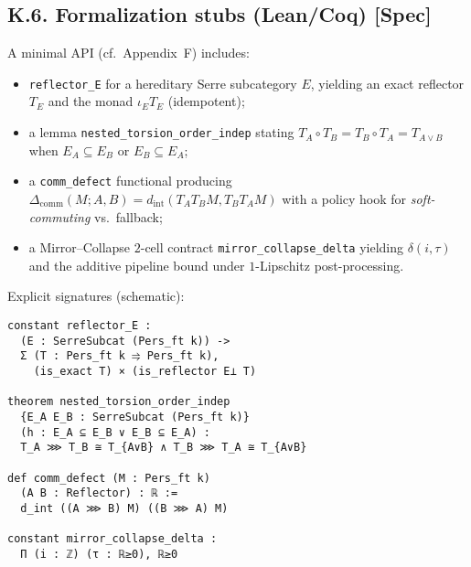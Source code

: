 \documentclass[11pt]{article}
\numberwithin{equation}{section}
\theoremstyle{plain}
\theoremstyle{definition}
\theoremstyle{remark}
\DeclareRobustCommand{\hyp}{\nobreakdash-}
\theoremstyle{plain}
\theoremstyle{definition}
\numberwithin{equation}{section}
\theoremstyle{definition}
\numberwithin{equation}{section}
\theoremstyle{plain}
\theoremstyle{definition}
\theoremstyle{remark}
\begin{document}
\subsection*{K.6. Formalization stubs (Lean/Coq) [Spec]}
A minimal API (cf.\ Appendix~F) includes:
\begin{itemize}\itemsep0.2em
  \item \texttt{reflector\_E} for a hereditary Serre subcategory \(E\), yielding an exact reflector \(T_E\) and the monad \(\iota_E T_E\) (idempotent);
  \item a lemma \texttt{nested\_torsion\_order\_indep} stating \(T_A\circ T_B=T_B\circ T_A=T_{A\vee B}\) when \(E_A\subseteq E_B\) or \(E_B\subseteq E_A\);
  \item a \texttt{comm\_defect} functional producing \(\Delta_{\mathrm{comm}}(M;A,B)=d_{\mathrm{int}}(T_AT_BM,T_BT_AM)\) with a policy hook for \emph{soft\hyp commuting} vs.\ fallback;
  \item a Mirror–Collapse \(2\)\hyp cell contract \texttt{mirror\_collapse\_delta} yielding \(\delta(i,\tau)\) and the additive pipeline bound under \(1\)\hyp Lipschitz post\hyp processing.
\end{itemize}

\noindent
Explicit signatures (schematic):
\begin{verbatim}
constant reflector_E :
  (E : SerreSubcat (Pers_ft k)) ->
  Σ (T : Pers_ft k ⥤ Pers_ft k),
    (is_exact T) × (is_reflector E⊥ T)

theorem nested_torsion_order_indep
  {E_A E_B : SerreSubcat (Pers_ft k)}
  (h : E_A ⊆ E_B ∨ E_B ⊆ E_A) :
  T_A ⋙ T_B ≅ T_{A∨B} ∧ T_B ⋙ T_A ≅ T_{A∨B}

def comm_defect (M : Pers_ft k)
  (A B : Reflector) : ℝ :=
  d_int ((A ⋙ B) M) ((B ⋙ A) M)

constant mirror_collapse_delta :
  Π (i : ℤ) (τ : ℝ≥0), ℝ≥0
\end{verbatim}

\end{document}
